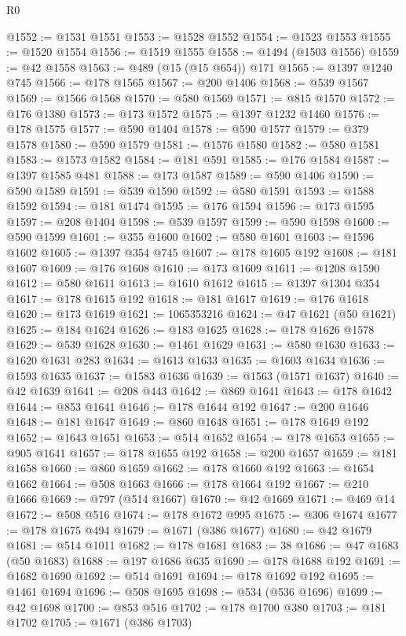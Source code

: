 \begin{lexlean}{R0}
\begin{coremodule}
@1552 := @1531 @1551
@1553 := @1528 @1552
@1554 := @1523 @1553
@1555 := @1520 @1554
@1556 := @1519 @1555
@1558 := @1494 (@1503 @1556)
@1559 := @42 @1558
@1563 := @489 (@15 (@15 @654)) @171
@1565 := @1397 @1240 @745
@1566 := @178 @1565
@1567 := @200 @1406
@1568 := @539 @1567
@1569 := @1566 @1568
@1570 := @580 @1569
@1571 := @815 @1570
@1572 := @176 @1380
@1573 := @173 @1572
@1575 := @1397 @1232 @1460
@1576 := @178 @1575
@1577 := @590 @1404
@1578 := @590 @1577
@1579 := @379 @1578
@1580 := @590 @1579
@1581 := @1576 @1580
@1582 := @580 @1581
@1583 := @1573 @1582
@1584 := @181 @591
@1585 := @176 @1584
@1587 := @1397 @1585 @481
@1588 := @173 @1587
@1589 := @590 @1406
@1590 := @590 @1589
@1591 := @539 @1590
@1592 := @580 @1591
@1593 := @1588 @1592
@1594 := @181 @1474
@1595 := @176 @1594
@1596 := @173 @1595
@1597 := @208 @1404
@1598 := @539 @1597
@1599 := @590 @1598
@1600 := @590 @1599
@1601 := @355 @1600
@1602 := @580 @1601
@1603 := @1596 @1602
@1605 := @1397 @354 @745
@1607 := @178 @1605 @192
@1608 := @181 @1607
@1609 := @176 @1608
@1610 := @173 @1609
@1611 := @1208 @1590
@1612 := @580 @1611
@1613 := @1610 @1612
@1615 := @1397 @1304 @354
@1617 := @178 @1615 @192
@1618 := @181 @1617
@1619 := @176 @1618
@1620 := @173 @1619
@1621 := 1065353216
@1624 := @47 @1621 (@50 @1621)
@1625 := @184 @1624
@1626 := @183 @1625
@1628 := @178 @1626 @1578
@1629 := @539 @1628
@1630 := @1461 @1629
@1631 := @580 @1630
@1633 := @1620 @1631 @283
@1634 := @1613 @1633
@1635 := @1603 @1634
@1636 := @1593 @1635
@1637 := @1583 @1636
@1639 := @1563 (@1571 @1637)
@1640 := @42 @1639
@1641 := @208 @443
@1642 := @869 @1641
@1643 := @178 @1642
@1644 := @853 @1641
@1646 := @178 @1644 @192
@1647 := @200 @1646
@1648 := @181 @1647
@1649 := @860 @1648
@1651 := @178 @1649 @192
@1652 := @1643 @1651
@1653 := @514 @1652
@1654 := @178 @1653
@1655 := @905 @1641
@1657 := @178 @1655 @192
@1658 := @200 @1657
@1659 := @181 @1658
@1660 := @860 @1659
@1662 := @178 @1660 @192
@1663 := @1654 @1662
@1664 := @508 @1663
@1666 := @178 @1664 @192
@1667 := @210 @1666
@1669 := @797 (@514 @1667)
@1670 := @42 @1669
@1671 := @469 @14
@1672 := @508 @516
@1674 := @178 @1672 @995
@1675 := @306 @1674
@1677 := @178 @1675 @494
@1679 := @1671 (@386 @1677)
@1680 := @42 @1679
@1681 := @514 @1011
@1682 := @178 @1681
@1683 := 38
@1686 := @47 @1683 (@50 @1683)
@1688 := @197 @1686 @635
@1690 := @178 @1688 @192
@1691 := @1682 @1690
@1692 := @514 @1691
@1694 := @178 @1692 @192
@1695 := @1461 @1694
@1696 := @508 @1695
@1698 := @534 (@536 @1696)
@1699 := @42 @1698
@1700 := @853 @516
@1702 := @178 @1700 @380
@1703 := @181 @1702
@1705 := @1671 (@386 @1703)

\end{coremodule}
\end{lexlean}
